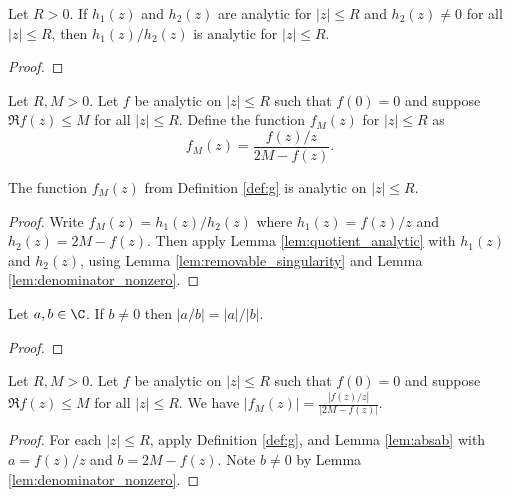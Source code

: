 \begin{lemma}\label{lem:quotient_analytic}  \leanok
Let $R>0$. If $h_1(z)$ and $h_2(z)$ are analytic for $|z|\le R$ and $h_2(z)\neq0$ for all $|z|\le R$, then $h_1(z)/h_2(z)$ is analytic for $|z|\le R$.
\end{lemma}
\begin{proof} \leanok
\end{proof}

\begin{definition} \label{def:g}  \leanok
Let $R,M>0$. Let $f$ be analytic on $|z| \le R$ such that $f(0)=0$ and suppose $\Re f(z) \le M$ for all $|z| \le R$. Define the function $f_M(z)$ for $|z| \le R$ as
\[ f_M(z) = \frac{f(z)/z}{2M - f(z)}. \]
\end{definition}

\begin{lemma}[g analytic]\label{lem:g_analytic}  \leanok
The function $f_M(z)$ from Definition \ref{def:g} is analytic on $|z| \le R$.
\end{lemma}
\begin{proof} \leanok
{}
Write $f_M(z) = h_1(z)/h_2(z)$ where $h_1(z)=f(z)/z$ and $h_2(z)=2M-f(z)$.
Then apply Lemma \ref{lem:quotient_analytic} with $h_1(z)$ and $h_2(z)$, using Lemma \ref{lem:removable_singularity} and Lemma \ref{lem:denominator_nonzero}.
\end{proof}

\begin{lemma}\label{lem:absab}  \leanok
Let $a,b\in\C$. If $b\neq0$ then $|a/b| = |a|/|b|$.
\end{lemma}
\begin{proof} \leanok
\end{proof}

\begin{lemma}[g modulus]\label{lem:g_on_boundaryz}  \leanok
Let $R,M>0$. Let $f$ be analytic on $|z| \le R$ such that $f(0)=0$ and suppose $\Re f(z) \le M$ for all $|z| \le R$. We have $|f_M(z)| = \frac{|f(z)/z|}{|2M - f(z)|}$.
\end{lemma}
\begin{proof} \leanok
{}
For each $|z|\le R$, apply Definition \ref{def:g}, and Lemma \ref{lem:absab} with $a=f(z)/z$ and $b=2M-f(z)$. Note $b\neq0$ by Lemma \ref{lem:denominator_nonzero}.
\end{proof}

